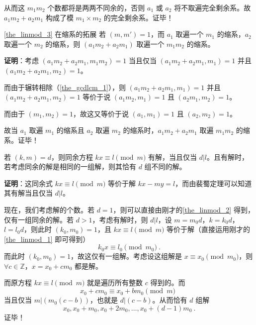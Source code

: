 从而这 $m_1m_2$ 个数都将是两两不同余的，否则 $a_1$ 或 $a_2$ 将不取遍完全剩余系。故 $a_1m_2+a_2m_1$ 构成了模 $m_1\times m_2$ 的完全剩余系。证毕！

\begin{theorem}{\autoref{the_linmod_3} 在缩系的拓展}
若 $(m, m') = 1$，而 $a_1$ 取遍一个 $m_1$ 的缩系，$a_2$ 取遍一个 $m_2$ 的缩系，则 $(a_1m_2 + a_2 m_1)$ 取遍一个 $m_1m_2$ 的缩系。
\end{theorem}
\textbf{证明}：考虑 $(a_1m_2 + a_2m_1, m_1m_2) = 1$ 当且仅当 $(a_1m_2 + a_2m_1, m_1) = 1$ 并且 $(a_1m_2 + a_2m_1, m_2) = 1$。

而由于辗转相除（\autoref{the_gcdlcm_1}），则 $(a_1m_2 + a_2m_1, m_1) = 1$ 并且 $(a_1m_2 + a_2m_1, m_2) = 1$ 等价于说 $(a_1m_2, m_1) = 1$ 且 $(a_2m_1, m_2) = 1$。

而由于 $(m_1, m_2)=1$，故这又等价于说 $(a_1, m_1) = 1$ 且 $(a_2, m_2) = 1$。

故当 $a_1$ 取遍 $m_1$ 的缩系且 $a_2$ 取遍 $m_2$ 的缩系时，$a_1m_2+a_2m_1$ 取遍 $m_1m_2$ 的缩系。证毕！


\begin{theorem}{}\label{the_linmod_4}
若 $(k, m) = d$，则同余方程 $kx \equiv l \pmod m$ 有解，当且仅当 $d | l$。且有解时，若考虑同余的解是相同的一组解，则其恰有 $d$ 组不同的解。
\end{theorem}
\textbf{证明}：这同余式 $kx \equiv l \pmod m$ 等价于解 $kx - my = l$，而由裴蜀定理可以知道其有解当且仅当 $d | l$。

现在，我们考虑解的个数。若 $d=1$，则可以直接由刚才的\autoref{the_linmod_2} 得到，仅有一组同余的解。若 $d > 1$，考虑有解时，则 $d|l$，设 $m = m_0 d$，$k = k_0 d$，$l = l_0 d$，则此时 $(k_0, m_0) = 1$，且 $kx \equiv l \pmod m$ 等价于解（直接运用刚才的\autoref{the_linmod_1} 即可得到）
\begin{equation}
k_0 x \equiv l_0 \pmod {m_0} ~.
\end{equation}
而此时 $(k_0, m_0) = 1$，故这仅有一组解。考虑设这组解是 $x \equiv x_0 \pmod {m_0}$，则 $\forall c \in \mathbb Z$，$x = x_0 + c m_0$ 都是解。

而原方程 $kx \equiv l \pmod m$ 就是遍历所有整数 $c$ 得到的。而
\begin{equation}
x_0 + c m_0 \equiv x_0 + b m_0 \pmod m ~~
\end{equation}
当且仅当 $m | (m_0 (c - b))$，也就是 $d | (c - b)$。从而恰有 $d$ 组解
\begin{equation}
x_0, x_0 + m_0, x_0 + 2 m_0, \dots, x_0 + (d-1) m_0 ~.
\end{equation}
证毕！